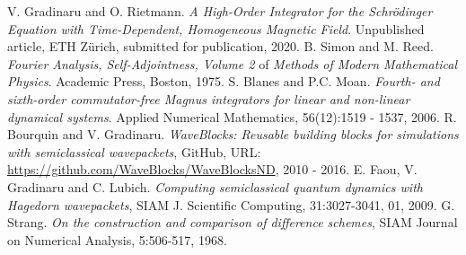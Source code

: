 \documentclass{article}
\begin{document}
\begin{thebibliography}{9}
  V. Gradinaru and O. Rietmann.
  \emph{A High-Order Integrator for the
          Schr{\"o}dinger Equation with Time-Dependent,
          Homogeneous Magnetic Field}.
  Unpublished article, ETH Z{\"u}rich, submitted for publication, 2020.
  B. Simon and M. Reed.
  \emph{Fourier Analysis, Self-Adjointness, Volume 2} of \emph{Methods of Modern Mathematical Physics}.
  Academic Press, Boston, 1975.
  S. Blanes and P.C. Moan.
  \emph{Fourth- and sixth-order commutator-free Magnus integrators for linear and non-linear dynamical systems}.
  Applied Numerical Mathematics, 56(12):1519 - 1537, 2006.
  R. Bourquin and V. Gradinaru.
  \emph{{WaveBlocks}: Reusable building blocks for simulations with semiclassical wavepackets},
  GitHub, URL: \url{https://github.com/WaveBlocks/WaveBlocksND},
  2010 - 2016.
  E. Faou, V. Gradinaru and C. Lubich.
  \emph{Computing semiclassical quantum dynamics with Hagedorn wavepackets},
  SIAM J. Scientific Computing, 31:3027-3041, 01, 2009.
  G. Strang.
  \emph{On the construction and comparison of difference schemes},
  SIAM Journal on Numerical Analysis, 5:506-517, 1968.
\end{thebibliography}
\end{document}
